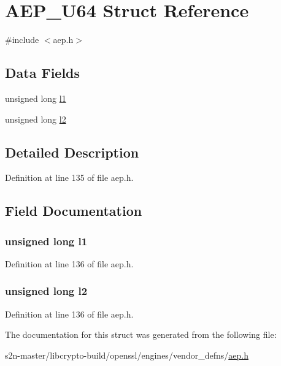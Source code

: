 \hypertarget{struct_a_e_p___u64}{}\section{A\+E\+P\+\_\+\+U64 Struct Reference}
\label{struct_a_e_p___u64}


{\ttfamily \#include $<$aep.\+h$>$}

\subsection*{Data Fields}
\begin{DoxyCompactItemize}
\item 
unsigned long \hyperlink{struct_a_e_p___u64_afb24c9d6730910b84325d7ddef3d4c6a}{l1}
\item 
unsigned long \hyperlink{struct_a_e_p___u64_adc7468f903580d332979fd4522e17aa8}{l2}
\end{DoxyCompactItemize}


\subsection{Detailed Description}


Definition at line 135 of file aep.\+h.



\subsection{Field Documentation}
\subsubsection[{\texorpdfstring{l1}{l1}}]{\setlength{\rightskip}{0pt plus 5cm}unsigned long l1}\hypertarget{struct_a_e_p___u64_afb24c9d6730910b84325d7ddef3d4c6a}{}\label{struct_a_e_p___u64_afb24c9d6730910b84325d7ddef3d4c6a}


Definition at line 136 of file aep.\+h.

\subsubsection[{\texorpdfstring{l2}{l2}}]{\setlength{\rightskip}{0pt plus 5cm}unsigned long l2}\hypertarget{struct_a_e_p___u64_adc7468f903580d332979fd4522e17aa8}{}\label{struct_a_e_p___u64_adc7468f903580d332979fd4522e17aa8}


Definition at line 136 of file aep.\+h.



The documentation for this struct was generated from the following file\+:\begin{DoxyCompactItemize}
\item 
s2n-\/master/libcrypto-\/build/openssl/engines/vendor\+\_\+defns/\hyperlink{aep_8h}{aep.\+h}\end{DoxyCompactItemize}
